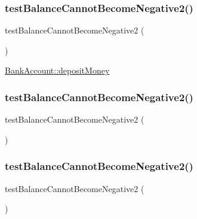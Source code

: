 \subsubsection{\texorpdfstring{test\+Balance\+Cannot\+Become\+Negative2()}{testBalanceCannotBecomeNegative2()}\hspace{0.1cm}{\footnotesize\ttfamily [1/3]}}
{\footnotesize\ttfamily test\+Balance\+Cannot\+Become\+Negative2 (\begin{DoxyParamCaption}{ }\end{DoxyParamCaption})}

\mbox{\hyperlink{class_bank_account_aeb1e8e91e4a2b1543ae0644bd3723777}{Bank\+Account\+::deposit\+Money}} \mbox{\label{class_bank_account_test_ab2649a638e0cf85418cb1fb149d9e98c}} 
\subsubsection{\texorpdfstring{test\+Balance\+Cannot\+Become\+Negative2()}{testBalanceCannotBecomeNegative2()}\hspace{0.1cm}{\footnotesize\ttfamily [2/3]}}
{\footnotesize\ttfamily test\+Balance\+Cannot\+Become\+Negative2 (\begin{DoxyParamCaption}{ }\end{DoxyParamCaption})}

\mbox{\label{class_bank_account_test_ab2649a638e0cf85418cb1fb149d9e98c}} 
\subsubsection{\texorpdfstring{test\+Balance\+Cannot\+Become\+Negative2()}{testBalanceCannotBecomeNegative2()}\hspace{0.1cm}{\footnotesize\ttfamily [3/3]}}
{\footnotesize\ttfamily test\+Balance\+Cannot\+Become\+Negative2 (\begin{DoxyParamCaption}{ }\end{DoxyParamCaption})}

